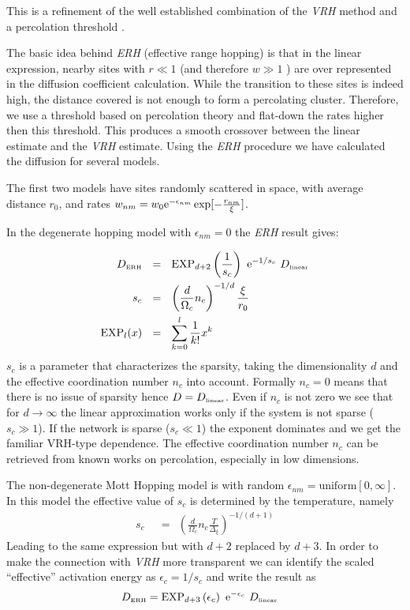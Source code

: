 This is a refinement of the well established combination
of the \emph{VRH} method and a percolation threshold
 \cite{miller_impurity_1960,ambegaokar_hopping_1971,halperin_remarks_1989,pollak_percolation_1972}.


The basic idea behind \emph{ERH} (effective range hopping) is that in the linear
expression, nearby sites 
with $r\ll 1$ (and therefore $w \gg 1$ ) are over represented in
the diffusion coefficient calculation. While the transition to
these sites is indeed high, the distance covered is not enough
to form a percolating cluster. Therefore, we use a threshold based
on percolation theory and flat-down the rates higher then this threshold.
This produces a smooth crossover between the linear
estimate and the \emph{VRH} estimate.
Using the \emph{ERH} procedure we have calculated the diffusion for 
several models.


The first two models have sites randomly scattered 
in space, with average distance $r_0$, and rates $w_{nm} = w_0\mbox{e}^{-\epsilon_{nm}} \exp[-\frac{r_{nm}}{\xi}]$.


In the degenerate hopping model with $\epsilon_{nm} =0$ the \emph{ERH} result gives:

\begin{align}
D_{\tbox{ERH}} \ \ &=\ \  \mathrm{EXP}_{d{+}2}\left(\frac{1}{s_c}\right)  \  \eexp{-1/s_c}  \ D_{\tbox{linear}}\\
s_c\ \  &=\ \  \left(\frac{d}{\Omega_c} n_c\right)^{-1/d} \frac{\xi}{r_0}\\
\mathrm{EXP}_{l}(x) \ \ &=\ \ \sum_{k=0}^l \frac{1}{k!}x^k
\end{align}
$s_c$ is a parameter that characterizes the sparsity,
taking the dimensionality $d$ and the effective coordination number
$n_c$ into account. Formally $n_c=0$ means that there is no issue of sparsity hence 
$D=D_{\mbox{\tiny linear}}$.
Even if $n_c$ is not zero we see that for
$d\rightarrow \infty$ the linear approximation works only if the
system is not sparse ($s_c\gg 1$). If the network is sparse ($s_c\ll 1$)
the exponent dominates and we get the familiar VRH-type dependence.
The effective coordination number $n_c$ can be retrieved from
known works on percolation, especially in low dimensions.


The non-degenerate Mott Hopping model is with random $\epsilon_{nm} = \textrm{uniform} [0,\infty]$.
In this model the effective value of $s_c$ is determined by the temperature,
namely
%
\begin{align}
s_c\ \ &=\ \ \left(\frac{d}{\Omega_c} n_c \frac{T}{\Delta_\xi} \right)^{-1/(d+1)} 
\end{align}
%
Leading to the same expression
but with $d+2$ replaced by $d+3$. In order to make the connection
with \emph{VRH} more transparent we can identify the scaled ``effective''
activation energy as $\epsilon_c=1/s_c$ and write the result as
%
\begin{align}
D_{\tbox{ERH}} &=\mathrm{EXP}_{d{+}3}\left(\epsilon_c\right)  \  \eexp{-\epsilon_c}  \ D_{\tbox{linear}}
\end{align}
%


